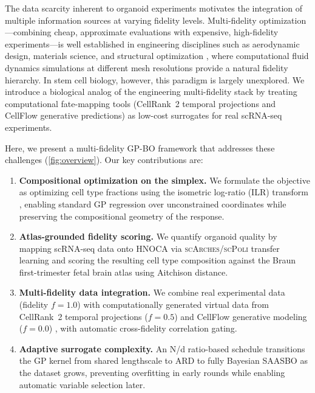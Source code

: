 \documentclass[times,twoside]{zHenriquesLab-StyleBioRxiv}
\newcommand{\hnoca}{\textsc{HNOCA}}
\newcommand{\scpoli}{\textsc{scPoli}}
\newcommand{\scarches}{\textsc{scArches}}
\begin{document}
The data scarcity inherent to organoid experiments motivates the integration of multiple information sources at varying fidelity levels. Multi-fidelity optimization---combining cheap, approximate evaluations with expensive, high-fidelity experiments---is well established in engineering disciplines such as aerodynamic design, materials science, and structural optimization \cite{Poloczek2017, Wu2019multifidelity}, where computational fluid dynamics simulations at different mesh resolutions provide a natural fidelity hierarchy. In stem cell biology, however, this paradigm is largely unexplored. We introduce a biological analog of the engineering multi-fidelity stack by treating computational fate-mapping tools (CellRank~2 temporal projections and CellFlow generative predictions) as low-cost surrogates for real scRNA-seq experiments.

Here, we present a multi-fidelity GP-BO framework that addresses these challenges (\cref{fig:overview}). Our key contributions are:

\begin{enumerate}[nosep,leftmargin=*]
  \item \textbf{Compositional optimization on the simplex.} We formulate the objective as optimizing cell type fractions using the isometric log-ratio (ILR) transform \cite{Aitchison1986}, enabling standard GP regression over unconstrained coordinates while preserving the compositional geometry of the response.
  \item \textbf{Atlas-grounded fidelity scoring.} We quantify organoid quality by mapping scRNA-seq data onto \hnoca{} \cite{He2024hnoca} via \scarches{}/\scpoli{} transfer learning \cite{Lotfollahi2022scarches, DeDonno2023scpoli} and scoring the resulting cell type composition against the Braun first-trimester fetal brain atlas \cite{Braun2023} using Aitchison distance.
  \item \textbf{Multi-fidelity data integration.} We combine real experimental data (fidelity $f{=}1.0$) with computationally generated virtual data from CellRank~2 temporal projections ($f{=}0.5$) \cite{Lange2022cellrank, Weiler2024cellrank2, Klein2025moscot} and CellFlow generative modeling ($f{=}0.0$) \cite{Klein2025cellflow}, with automatic cross-fidelity correlation gating.
  \item \textbf{Adaptive surrogate complexity.} An N/d ratio-based schedule \cite{Qin2025naiad} transitions the GP kernel from shared lengthscale to ARD to fully Bayesian SAASBO \cite{Eriksson2021saasbo} as the dataset grows, preventing overfitting in early rounds while enabling automatic variable selection later.
\end{enumerate}
\end{document}
